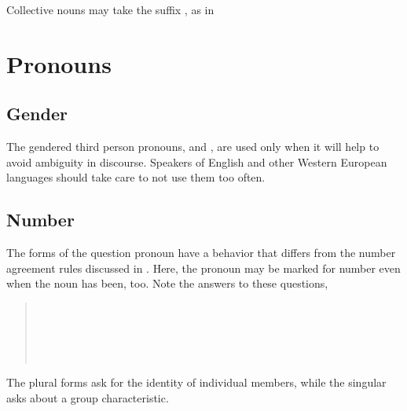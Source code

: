 \subsubsection{} Collective nouns may take the suffix , as in
 


\section{Pronouns}


\subsection{Gender} The gendered third person pronouns,  and
, are used only when it will help to avoid ambiguity in
discourse.  Speakers of English and other Western European languages
should take care to not use them too often. \label{syn:pron:gender}

\subsection{Number} The forms of the question pronoun  have
a behavior that differs from the number agreement rules discussed
in . \label{syn:pron:q-number}
Here, the pronoun may be marked for number even when the noun has
been, too.  Note the answers to these questions,

\begin{quotation}
\noindent{} \\
\noindent{} \\

\noindent{} \\
\noindent{}\\
\indent{}
\end{quotation}

\noindent The plural forms ask for the identity of individual members,
while the singular asks about a group characteristic.

